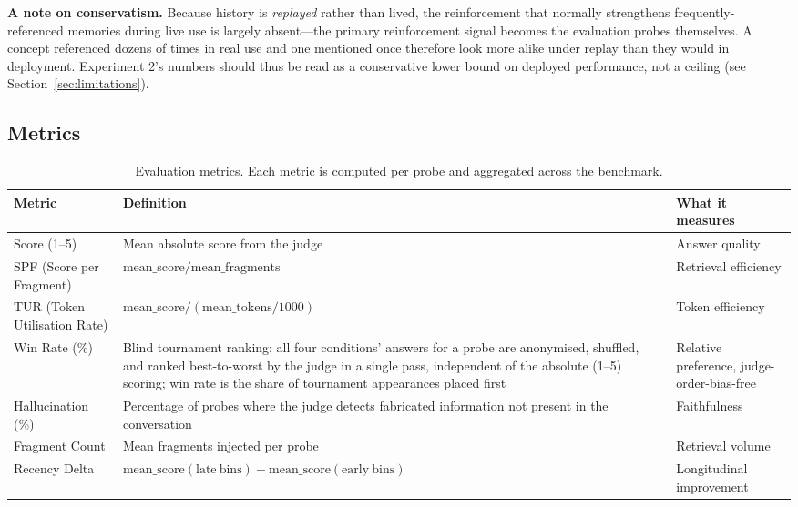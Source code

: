 \documentclass[10pt]{article}
\begin{document}
\textbf{A note on conservatism.} Because history is \emph{replayed} rather than lived, the reinforcement that normally strengthens frequently-referenced memories during live use is largely absent---the primary reinforcement signal becomes the evaluation probes themselves. A concept referenced dozens of times in real use and one mentioned once therefore look more alike under replay than they would in deployment. Experiment 2's numbers should thus be read as a conservative lower bound on deployed performance, not a ceiling (see Section~\ref{sec:limitations}).

\subsection{Metrics}

\begin{table}[htbp]
\centering
\small
\caption{Evaluation metrics. Each metric is computed per probe and aggregated across the benchmark.}
\label{tab:metrics}
\begin{tabular}{p{}p{}p{}}
\toprule
\textbf{Metric} & \textbf{Definition} & \textbf{What it measures} \\
\midrule
Score (1--5) & Mean absolute score from the judge & Answer quality \\
SPF (Score per Fragment) & $\mathrm{mean\_score} / \mathrm{mean\_fragments}$ & Retrieval efficiency \\
TUR (Token Utilisation Rate) & $\mathrm{mean\_score} / (\mathrm{mean\_tokens}/1000)$ & Token efficiency \\
Win Rate (\%) & Blind tournament ranking: all four conditions' answers for a probe are anonymised, shuffled, and ranked best-to-worst by the judge in a single pass, independent of the absolute (1--5) scoring; win rate is the share of tournament appearances placed first & Relative preference, judge-order-bias-free \\
Hallucination (\%) & Percentage of probes where the judge detects fabricated information not present in the conversation & Faithfulness \\
Fragment Count & Mean fragments injected per probe & Retrieval volume \\
Recency Delta & $\mathrm{mean\_score}(\mathrm{late\ bins}) - \mathrm{mean\_score}(\mathrm{early\ bins})$ & Longitudinal improvement \\
\bottomrule
\end{tabular}
\end{table}
\end{document}

